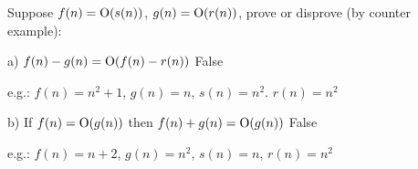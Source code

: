 \begin{prob}

Suppose $f(n) = {\rm O}(s(n))$, $g(n) = {\rm O}(r(n))$, prove or disprove (by counter example):

a) $f(n) - g(n) = {\rm O}(f(n) - r(n))$ False

e.g.: $f(n) = n^2 + 1$, $g(n) = n$, $s(n) = n^2$. $r(n) = n^2$

b) If $f(n) = {\rm O}(g(n))$ then $f(n) + g(n) = {\rm O}(g(n))$ False

e.g.: $f(n) = n + 2$, $g(n) = n^2$, $s(n) = n$, $r(n) = n^2$
\end{prob}














